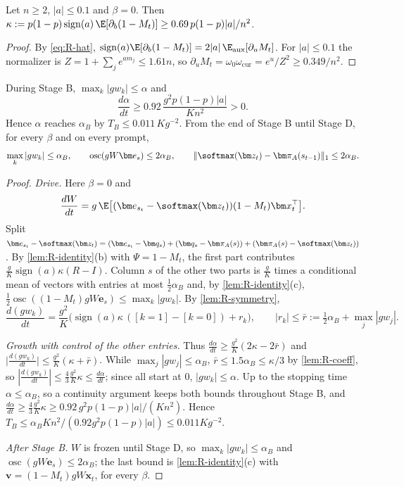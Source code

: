 \begin{lemma}
\label{lem:R-coeff}
Let $n\ge2$, $|a|\le0.1$ and $\beta=0$. Then $\kappa:=p(1-p)\operatorname{sign}(a)\,\E[\partial_b(1-M_t)]\ge0.69\,p(1-p)|a|/n^2$.
\end{lemma}

\begin{proof}
By \cref{eq:R-hat}, $\operatorname{sign}(a)\E[\partial_b(1-M_t)]=2|a|\,\E_{\mathrm{aux}}[\partial_uM_t]$. For $|a|\le0.1$ the normalizer is
$Z=1+\sum_je^{am_j}\le1.61n$, so $\partial_uM_t=\omega_0\omega_{\mathrm{cur}}=e^u/Z^2\ge0.349/n^2$.
\end{proof}

\begin{lemma}[Stage B]
\label{lem:R-B}
During Stage B, $\max_k|gw_k|\le\alpha$ and
\[
 \frac{d\alpha}{dt}\ge0.92\,\frac{g^2p(1-p)|a|}{Kn^2}>0.
\]
Hence $\alpha$ reaches $\alpha_B$ by $T_B\le0.011\,Kg^{-2}$. From the end of Stage B until Stage D, for every $\beta$ and on every prompt,
\[
 \max_k|gw_k|\le\alpha_B,\qquad \operatorname{osc}(gW\bm e_s)\le2\alpha_B,\qquad \|\softmax(\bm z_t)-\bm\pi_A(s_{t-1})\|_1\le2\alpha_B .
\]
\end{lemma}

\begin{proof}
\emph{Drive.} Here $\beta=0$ and
\[
 \frac{dW}{dt}=g\,\E\bigl[(\bm e_{s_t}-\softmax(\bm z_t))(1-M_t)\bm x_t^\top\bigr].
\]
Split $\bm e_{s_t}-\softmax(\bm z_t)=(\bm e_{s_t}-\bm q_s)+(\bm q_s-\bm\pi_A(s))+(\bm\pi_A(s)-\softmax(\bm z_t))$. By \cref{lem:R-identity}(b) with
$\Psi=1-M_t$, the first part contributes $\tfrac gK\operatorname{sign}(a)\kappa(R-I)$. Column $s$ of the other two parts is $\tfrac gK$ times
a conditional mean of vectors with entries at most $\tfrac12\alpha_B$ and, by \cref{lem:R-identity}(c),
$\tfrac12\operatorname{osc}((1-M_t)gW\bm e_s)\le\max_k|gw_k|$. By \cref{lem:R-symmetry},
\[
 \frac{d(gw_k)}{dt}=\frac{g^2}K\bigl(\operatorname{sign}(a)\kappa\,([k=1]-[k=0])+r_k\bigr),
 \qquad |r_k|\le\bar r:=\tfrac12\alpha_B+\max_j|gw_j|.
\]

\emph{Growth with control of the other entries.} Thus $\tfrac{d\alpha}{dt}\ge\tfrac{g^2}K(2\kappa-2\bar r)$ and
$\bigl|\tfrac{d(gw_k)}{dt}\bigr|\le\tfrac{g^2}K(\kappa+\bar r)$. While $\max_j|gw_j|\le\alpha_B$, $\bar r\le1.5\alpha_B\le\kappa/3$ by
\cref{lem:R-coeff}, so $|\tfrac{d(gw_k)}{dt}|\le\tfrac43\tfrac{g^2}K\kappa\le\tfrac{d\alpha}{dt}$; since all start at $0$, $|gw_k|\le\alpha$. Up to the stopping
time $\alpha\le\alpha_B$, so a continuity argument keeps both bounds throughout Stage B, and
$\tfrac{d\alpha}{dt}\ge\tfrac43\tfrac{g^2}K\kappa\ge0.92\,g^2p(1-p)|a|/(Kn^2)$. Hence $T_B\le\alpha_BKn^2/(0.92g^2p(1-p)|a|)\le0.011Kg^{-2}$.

\emph{After Stage B.} $W$ is frozen until Stage D, so $\max_k|gw_k|\le\alpha_B$ and $\operatorname{osc}(gW\bm e_s)\le2\alpha_B$; the last bound is
\cref{lem:R-identity}(c) with $\bm v=(1-M_t)gW\bm x_t$, for every $\beta$.
\end{proof}

